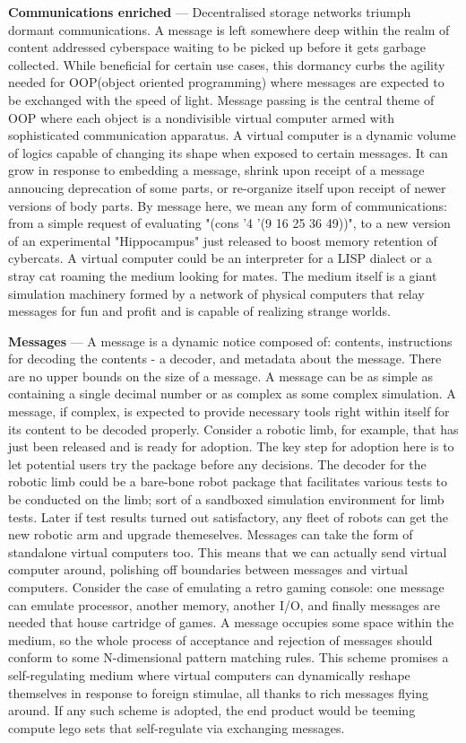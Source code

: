 \documentclass[a4paper, 10pt]{article}
\begin{document}
\par
\textbf{Communications enriched} --- Decentralised storage networks triumph dormant communications. A message is left somewhere deep within the realm of content addressed cyberspace waiting to be picked up before it gets garbage collected. While beneficial for certain use cases, this dormancy curbs the agility needed for OOP(object oriented programming)\cite{kay:1996} where messages are expected to be exchanged with the speed of light. Message passing is the central theme of OOP where each object is a nondivisible virtual computer armed with sophisticated communication apparatus. A virtual computer is a dynamic volume of logics capable of changing its shape when exposed to certain messages. It can grow in response to embedding a message, shrink upon receipt of a message annoucing deprecation of some parts, or re-organize itself upon receipt of newer versions of body parts. By message here, we mean any form of communications: from a simple request of evaluating "(cons '4 '(9 16 25 36 49))", to a new version of an experimental "Hippocampus" just released to boost memory retention of cybercats. A virtual computer could be an interpreter for a LISP dialect or a stray cat roaming the medium looking for mates. The medium itself is a giant simulation machinery formed by a network of physical computers that relay messages for fun and profit and is capable of realizing strange worlds.
\par
\textbf{Messages} --- A message is a dynamic notice composed of: contents, instructions for decoding the contents - a decoder, and metadata about the message. There are no upper bounds on the size of a message. A message can be as simple as containing a single decimal number or as complex as some complex simulation. A message, if complex, is expected to provide necessary tools right within itself for its content to be decoded properly. Consider a robotic limb, for example, that has just been released and is ready for adoption. The key step for adoption here is to let potential users try the package before any decisions. The decoder for the robotic limb could be a bare-bone robot package that facilitates various tests to be conducted on the limb; sort of a sandboxed simulation environment for limb tests. Later if test results turned out satisfactory, any fleet of robots can get the new robotic arm and upgrade themeselves. Messages can take the form of standalone virtual computers too. This means that we can actually send virtual computer around, polishing off boundaries between messages and virtual computers. Consider the case of emulating a retro gaming console: one message can emulate processor, another memory, another I/O, and finally messages are needed that house cartridge of games. A message occupies some space within the medium, so the whole process of acceptance and rejection of messages should conform to some N-dimensional pattern matching rules. This scheme promises a self-regulating medium where virtual computers can dynamically reshape themselves in response to foreign stimulae, all thanks to rich messages flying around. If any such scheme is adopted, the end product would be teeming compute lego sets that self-regulate via exchanging messages. 
\end{document}
